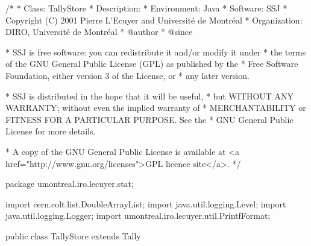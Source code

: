 \begin{code}
\begin{hide}
/*
 * Class:        TallyStore
 * Description:  
 * Environment:  Java
 * Software:     SSJ 
 * Copyright (C) 2001  Pierre L'Ecuyer and Université de Montréal
 * Organization: DIRO, Université de Montréal
 * @author       
 * @since

 * SSJ is free software: you can redistribute it and/or modify it under
 * the terms of the GNU General Public License (GPL) as published by the
 * Free Software Foundation, either version 3 of the License, or
 * any later version.

 * SSJ is distributed in the hope that it will be useful,
 * but WITHOUT ANY WARRANTY; without even the implied warranty of
 * MERCHANTABILITY or FITNESS FOR A PARTICULAR PURPOSE.  See the
 * GNU General Public License for more details.

 * A copy of the GNU General Public License is available at
   <a href="http://www.gnu.org/licenses">GPL licence site</a>.
 */
\end{hide}
package umontreal.iro.lecuyer.stat;\begin{hide}
import cern.colt.list.DoubleArrayList;
import java.util.logging.Level;
import java.util.logging.Logger;
import umontreal.iro.lecuyer.util.PrintfFormat;
\end{hide}


public class TallyStore extends Tally \begin{hide} {

   private DoubleArrayList array = null;  // Where the observations are stored.
   private Logger log = Logger.getLogger ("umontreal.iro.lecuyer.stat");
\end{hide}
\end{code}

